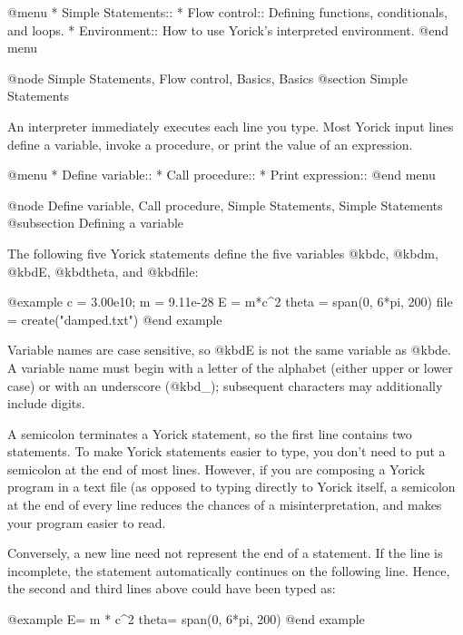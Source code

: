 @menu
* Simple Statements::           
* Flow control::                Defining functions, conditionals, and loops.
* Environment::                 How to use Yorick's interpreted environment.
@end menu

@node Simple Statements, Flow control, Basics, Basics
@section Simple Statements

An interpreter immediately executes each line you type.  Most Yorick
input lines define a variable, invoke a procedure, or print the value
of an expression.

@menu
* Define variable::             
* Call procedure::              
* Print expression::            
@end menu

@node Define variable, Call procedure, Simple Statements, Simple Statements
@subsection Defining a variable

The following five Yorick statements define the five variables @kbd{c},
@kbd{m}, @kbd{E}, @kbd{theta}, and @kbd{file}:

@example
c = 3.00e10;  m = 9.11e-28
E = m*c^2
theta = span(0, 6*pi, 200)
file = create("damped.txt")
@end example

Variable names are case sensitive, so @kbd{E} is not the same variable
as @kbd{e}.  A variable name must begin with a letter of the alphabet
(either upper or lower case) or with an underscore (@kbd{_});
subsequent characters may additionally include digits.

A semicolon terminates a Yorick statement, so the first line contains
two statements.  To make Yorick statements easier to type, you don't
need to put a semicolon at the end of most lines.  However, if you are
composing a Yorick program in a text file (as opposed to typing
directly to Yorick itself, a semicolon at the end of every line
reduces the chances of a misinterpretation, and makes your program
easier to read.

Conversely, a new line need not represent the end of a statement.  If
the line is incomplete, the statement automatically continues on the
following line.  Hence, the second and third lines above could have
been typed as:

@example
E=
  m *
  c^2
theta= span(0, 6*pi,
            200)
@end example

